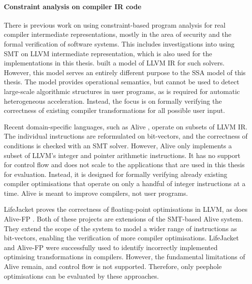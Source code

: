     \paragraph*{Constraint analysis on compiler IR code}
    There is previous work on using constraint-based program analysis for real
    compiler intermediate representations, mostly in the area of security and
    the formal verification of software systems.
    This includes investigations into using SMT on LLVM intermediate
    representation, which is also used for the implementations in this thesis.
    \citet{Zhao:2012:FLI:2103656.2103709} built a model of LLVM IR for such
    solvers.
    However, this model serves an entirely different purpose to the SSA model
    of this thesis.
    The model provides operational semantics, but cannot be used to detect
    large-scale algorithmic structures in user programs, as is required for
    automatic heterogeneous acceleration.
    Instead, the focus is on formally verifying the correctness of existing
    compiler transformations for all possible user input.

    Recent domain-specific languages, such as Alive
    \citep{Lopes:2015:PCP:2737924.2737965}, operate on subsets of LLVM IR.
    The individual instructions are reformulated on bit-vectors, and the
    correctness of conditions is checked with an SMT solver.
    However, Alive only implements a subset of LLVM's integer and pointer
    arithmetic instructions.
    It has no support for control flow and does not scale to the applications
    that are used in this thesis for evaluation.
    Instead, it is designed for formally verifying already existing
    compiler optimisations that operate on only a handful of integer
    instructions at a time.
    Alive is meant to improve compilers, not user programs.

    LifeJacket \citep{Notzli:2016:LVP:2931021.2931024} proves the correctness of
    floating-point optimisations in LLVM, as does Alive-FP \citep{Menendez2016}.
    Both of these projects are extensions of the SMT-based Alive system.
    They extend the scope of the system to model a wider range of
    instructions as bit-vectors, enabling the verification of more compiler
    optimisations.
    LifeJacket and Alive-FP were successfully used to identify incorrectly
    implemented  optimising transformations in compilers.
    However, the fundamental limitations of Alive remain, and control flow is
    not supported.
    Therefore, only peephole optimisations can be evaluated by these approaches.


